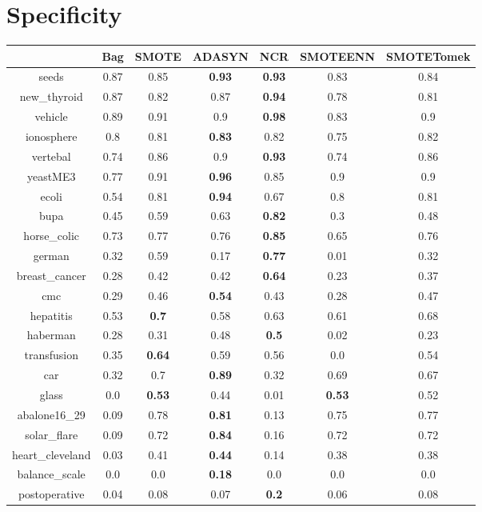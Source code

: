 \documentclass{article}%
\begin{document}
\section*{Specificity}%
\begin{tabular}{c|cccccc}%
&Bag&SMOTE&ADASYN&NCR&SMOTEENN&SMOTETomek\\%
\hline%
seeds&0.87&0.85&\textbf{0.93}&\textbf{0.93}&0.83&0.84\\%
new\_thyroid&0.87&0.82&0.87&\textbf{0.94}&0.78&0.81\\%
vehicle&0.89&0.91&0.9&\textbf{0.98}&0.83&0.9\\%
ionosphere&0.8&0.81&\textbf{0.83}&0.82&0.75&0.82\\%
vertebal&0.74&0.86&0.9&\textbf{0.93}&0.74&0.86\\%
yeastME3&0.77&0.91&\textbf{0.96}&0.85&0.9&0.9\\%
ecoli&0.54&0.81&\textbf{0.94}&0.67&0.8&0.81\\%
bupa&0.45&0.59&0.63&\textbf{0.82}&0.3&0.48\\%
horse\_colic&0.73&0.77&0.76&\textbf{0.85}&0.65&0.76\\%
german&0.32&0.59&0.17&\textbf{0.77}&0.01&0.32\\%
breast\_cancer&0.28&0.42&0.42&\textbf{0.64}&0.23&0.37\\%
cmc&0.29&0.46&\textbf{0.54}&0.43&0.28&0.47\\%
hepatitis&0.53&\textbf{0.7}&0.58&0.63&0.61&0.68\\%
haberman&0.28&0.31&0.48&\textbf{0.5}&0.02&0.23\\%
transfusion&0.35&\textbf{0.64}&0.59&0.56&0.0&0.54\\%
car&0.32&0.7&\textbf{0.89}&0.32&0.69&0.67\\%
glass&0.0&\textbf{0.53}&0.44&0.01&\textbf{0.53}&0.52\\%
abalone16\_29&0.09&0.78&\textbf{0.81}&0.13&0.75&0.77\\%
solar\_flare&0.09&0.72&\textbf{0.84}&0.16&0.72&0.72\\%
heart\_cleveland&0.03&0.41&\textbf{0.44}&0.14&0.38&0.38\\%
balance\_scale&0.0&0.0&\textbf{0.18}&0.0&0.0&0.0\\%
postoperative&0.04&0.08&0.07&\textbf{0.2}&0.06&0.08\\%
\end{tabular}

%
\end{document}
